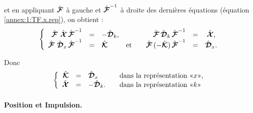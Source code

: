  et en appliquant $\hat{\bm{\mathcal{F}}}$ à gauche et $\hat{\bm{\mathcal{F}}}^{-1}$ à droite  des dernières équations (équation  \eqref{annex:1:TF.x.rep}), on obtient :
\begin{eqnarray}
    \left \{ 
        \begin{array}{rclcrlc}  
            \hat{\bm{\mathcal F}} \, \,  \hat{\bm{\mathcal X}} \, \hat{\bm{\mathcal{F}}}^{-1} &  =  &-\hat{\bm{\mathcal{D}}}_k, &&\hat{\bm{\mathcal{F}}}\, \hat{\bm{\mathcal{D}}}_k \, \hat{\bm{\mathcal{F}}}^{-1} &= &  \hat{\bm{\mathcal X}}, \\  \hat{\bm{\mathcal{F}}} \, \,  \hat{\bm{\mathcal{D}}}_x  \, \hat{\bm{\mathcal{F}}}^{-1}  & =  & \hat{\bm{\mathcal K}} &\mbox{et} &  \quad   \hat{\bm{\mathcal{F}}}\, ( - \hat{\bm{\mathcal K}} )\, \hat{\bm{\mathcal{F}}}^{-1} & =&  \hat{\bm{\mathcal{D}}}_x.
        \end{array} 
        \right . 
\end{eqnarray} 


Donc 
\begin{eqnarray} 
    \left \{ 
        \begin{array}{rclcl}  
            \operator{\mathcal K} & = & \operator{\mathcal{D}}_x & & \mbox{dans la représentation \guillemotleft{}$x$\guillemotright{}},  \\  
            \operator{\mathcal X} & = & -\operator{\mathcal{D}}_k. & & \mbox{dans la représentation \guillemotleft{}$k$\guillemotright{}}
        \end{array} 
        \right .
\end{eqnarray}

\paragraph{Position et Impulsion.}

